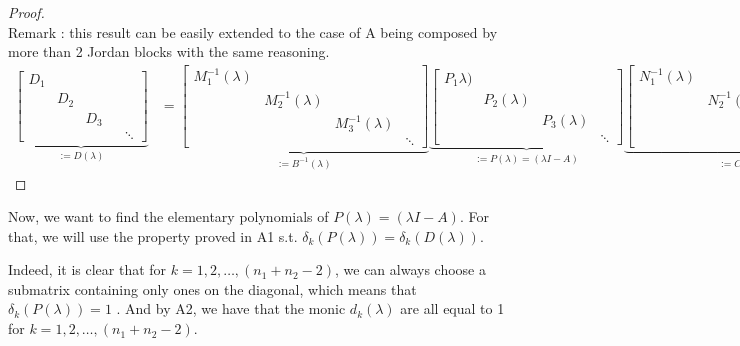 \documentclass[11pt]{article}
\begin{document}
\begin{proof}
~\\
Remark : this result can be easily extended to the case of A being composed by more than 2 Jordan blocks with the same reasoning. 
\footnotesize{
\begin{align}
\underbrace{\begin{bmatrix}
D_1 & & & \\
& D_2 & & \\
& & D_3 & \\
& & & & \ddots
\end{bmatrix} }_{:= D(\lambda)}
&=
\underbrace{\begin{bmatrix}
M_1^{-1}(\lambda) & & &\\
& M_2^{-1}(\lambda) & &\\
& & M_3^{-1}(\lambda) & \\
& & & \ddots
\end{bmatrix}}_{:=B^{-1}(\lambda)}
\underbrace{\begin{bmatrix}
P_1\lambda) & & &\\
& P_2(\lambda) & &\\
& & P_3(\lambda) &\\
& & & \ddots
\end{bmatrix}}_{:= P(\lambda) = (\lambda I - A)}
\underbrace{\begin{bmatrix}
N_1^{-1}(\lambda) & & &\\
& N_2^{-1}(\lambda) & &\\
& & N_3^{-1}(\lambda) & \\
& & & \ddots
\end{bmatrix}}_{:=C^{-1}(\lambda)}
\end{align}\label{a4}}

\end{proof}

Now, we want to find the elementary polynomials of $P(\lambda) = (\lambda I - A)$. For that, we will use the property proved in A1 s.t. $\delta_k(P(\lambda)) = \delta_k(D(\lambda))$.

Indeed, it is clear that for $k =1, 2, \dots,(n_1 + n_2 - 2)$, we can always choose a submatrix containing only ones on the diagonal, which means that $\delta_k(P(\lambda)) = 1$ . And by A2, we have that the monic $d_k(\lambda)$ are all equal to 1 for $k =1, 2, \dots, (n_1 + n_2 - 2)$. 
\end{document}
